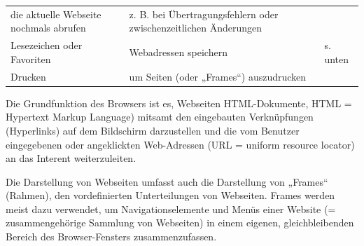 \documentclass[]{book}
\theoremstyle{definition}
\theoremstyle{definition}
\theoremstyle{definition}
\theoremstyle{remark}
\begin{document}
\begin{longtable}[]{@{}lll@{}}
\begin{minipage}[t]{0.27\columnwidth}
die aktuelle Webseite nochmals abrufen \vspace{5mm}\strut
\end{minipage} & \begin{minipage}[t]{0.33\columnwidth}\raggedright\strut
z. B. bei Übertragungsfehlern oder zwischenzeitlichen Änderungen
\vspace{5mm}\strut
\end{minipage}\tabularnewline
\begin{minipage}[t]{0.31\columnwidth}\raggedright\strut
Lesezeichen oder Favoriten \vspace{5mm}\strut
\end{minipage} & \begin{minipage}[t]{0.27\columnwidth}\raggedright\strut
Webadressen speichern \vspace{5mm}\strut
\end{minipage} & \begin{minipage}[t]{0.33\columnwidth}\raggedright\strut
s. unten \vspace{5mm}\strut
\end{minipage}\tabularnewline
\begin{minipage}[t]{0.31\columnwidth}\raggedright\strut
Drucken \vspace{5mm}\strut
\end{minipage} & \begin{minipage}[t]{0.27\columnwidth}\raggedright\strut
um Seiten (oder „Frames``) auszudrucken \vspace{5mm}\strut
\end{minipage} & \begin{minipage}[t]{0.33\columnwidth}\raggedright\strut
\strut
\end{minipage}\tabularnewline
\bottomrule
\end{longtable}

Die Grundfunktion des Browsers ist es, Webseiten HTML-Dokumente, HTML =
Hypertext Markup Language) mitsamt den eingebauten Verknüpfungen
(Hyperlinks) auf dem Bildschirm darzustellen und die vom Benutzer
eingegebenen oder angeklickten Web-Adressen (URL = uniform resource
locator) an das Interent weiterzuleiten.

Die Darstellung von Webseiten umfasst auch die Darstellung von „Frames``
(Rahmen), den vordefinierten Unterteilungen von Webseiten. Frames werden
meist dazu verwendet, um Navigationselemente und Menüs einer Website (=
zusammengehörige Sammlung von Webseiten) in einem eigenen,
gleichbleibenden Bereich des Browser-Fensters zusammenzufassen.
\end{document}
